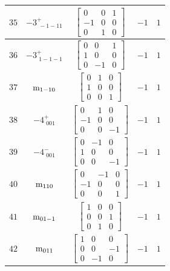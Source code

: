 \documentclass[fleqn,8pt]{jsarticle}
\begin{document}
\begin{longtable}{ccccc}
$ 35 $ & $ -3^{+}_{\,\,-1-11} $ & $ \begin{bmatrix} 0 & 0 & 1 \\ -1 & 0 & 0 \\ 0 & 1 & 0 \end{bmatrix} $ & $ -1 $ & $ 1 $ \\ \hline
$ 36 $ & $ -3^{+}_{\,\,1-1-1} $ & $ \begin{bmatrix} 0 & 0 & 1 \\ 1 & 0 & 0 \\ 0 & -1 & 0 \end{bmatrix} $ & $ -1 $ & $ 1 $ \\ \hline
$ 37 $ & $ {\rm m}_{1-10} $ & $ \begin{bmatrix} 0 & 1 & 0 \\ 1 & 0 & 0 \\ 0 & 0 & 1 \end{bmatrix} $ & $ -1 $ & $ 1 $ \\ \hline
$ 38 $ & $ -4^{+}_{\,\,001} $ & $ \begin{bmatrix} 0 & 1 & 0 \\ -1 & 0 & 0 \\ 0 & 0 & -1 \end{bmatrix} $ & $ -1 $ & $ 1 $ \\ \hline
$ 39 $ & $ -4^{-}_{\,\,001} $ & $ \begin{bmatrix} 0 & -1 & 0 \\ 1 & 0 & 0 \\ 0 & 0 & -1 \end{bmatrix} $ & $ -1 $ & $ 1 $ \\ \hline
$ 40 $ & $ {\rm m}_{110} $ & $ \begin{bmatrix} 0 & -1 & 0 \\ -1 & 0 & 0 \\ 0 & 0 & 1 \end{bmatrix} $ & $ -1 $ & $ 1 $ \\ \hline
$ 41 $ & $ {\rm m}_{01-1} $ & $ \begin{bmatrix} 1 & 0 & 0 \\ 0 & 0 & 1 \\ 0 & 1 & 0 \end{bmatrix} $ & $ -1 $ & $ 1 $ \\ \hline
$ 42 $ & $ {\rm m}_{011} $ & $ \begin{bmatrix} 1 & 0 & 0 \\ 0 & 0 & -1 \\ 0 & -1 & 0 \end{bmatrix} $ & $ -1 $ & $ 1 $ \\ \hline

\end{longtable}
\end{document}
